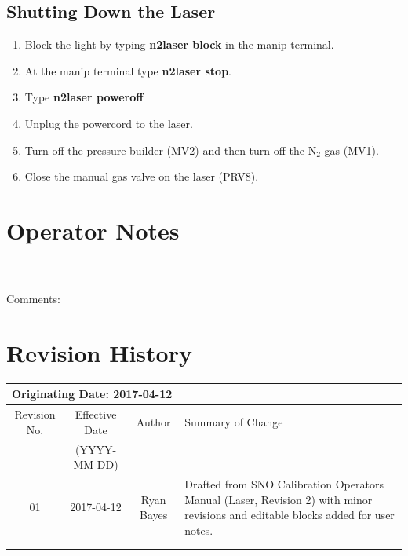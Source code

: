 \documentclass[11pt]{article}
\begin{document}
\subsection{Shutting Down the Laser}
\begin{enumerate}
\item \CheckBox[name=sdl1]{} Block the light by typing {\bf n2laser block} in the manip terminal.
\item \CheckBox[name=sdl2]{} At the manip terminal type {\bf n2laser stop}.
\item \CheckBox[name=sdl3]{} Type {\bf n2laser poweroff}
\item \CheckBox[name=sdl4]{} Unplug the powercord to the laser.
\item \CheckBox[name=sdl5]{} Turn off the pressure builder (MV2) and then turn off the N$_{2}$ gas (MV1).
\item \CheckBox[name=sdl6]{} Close the manual gas valve on the laser (PRV8).
\end{enumerate}

\section{Operator Notes}
\\ 
\\ 
Comments:\\
\TextField[name=opt,backgroundcolor=0.975 0.975 0.975,width=15cm,height=4.5cm]{}
\section{Revision History}
\begin{tabular}{|c|c|c|p{6cm}|}
\hline\hline
\multicolumn{4}{|l|}{Originating Date: 2017-04-12}\\
\hline
Revision No. & Effective Date & Author & Summary of Change \\
& (YYYY-MM-DD) & & \\
\hline
01 & 2017-04-12 & Ryan Bayes & Drafted from SNO Calibration Operators Manual (Laser, Revision 2) with minor revisions and editable blocks added for user notes.\\
\hline
& & & \\
\hline
& & & \\
\hline \hline

\end{tabular}
\end{document}
